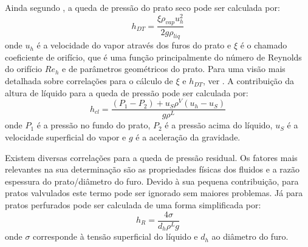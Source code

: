 Ainda segundo , a queda de pressão do prato seco pode ser calculada por:
\begin{equation}
h_{DT} = \dfrac{\xi \rho_{vap} u^2_ h}{2 g \rho_{liq}}
\end{equation}
onde $u_ h$ é a velocidade do vapor através dos furos do prato e $\xi$ é o chamado coeficiente de orifício,
que é uma função principalmente do número de Reynolds do orifício $Re_h$
e de parâmetros geométricos do prato. Para uma visão mais detalhada sobre correlações para o cálculo de $\xi$ e $h_{DT}$,
ver .
A contribuição da altura de líquido para a queda de pressão pode ser calculada por:
\begin{equation}
h_{cl} = \dfrac{\left( P_1 - P_2\right) + u_S \rho^V \left(u_h - u_S \right) }{g \rho^L}
\end{equation}
onde $P_1$ é a pressão no fundo do prato, $P_2$ é a pressão acima do líquido,
$u_ S$ é a velocidade superficial do vapor e $g$ é a aceleração da gravidade.

Existem diversas correlações para a queda de pressão residual. Os fatores mais relevantes na sua determinação
são as propriedades físicas dos fluidos e a razão espessura do prato/diâmetro do furo. Devido à sua pequena
contribuição, para pratos valvulados este termo pode ser ignorado sem maiores problemas. Já para pratos perfurados
pode ser calculada de uma forma simplificada por:
\begin{equation}
h_{R} = \dfrac{4\sigma }{d_h \rho^L g}
\end{equation}
onde $\sigma$ corresponde à tensão superficial do líquido e $d_h$ ao diâmetro do furo.

